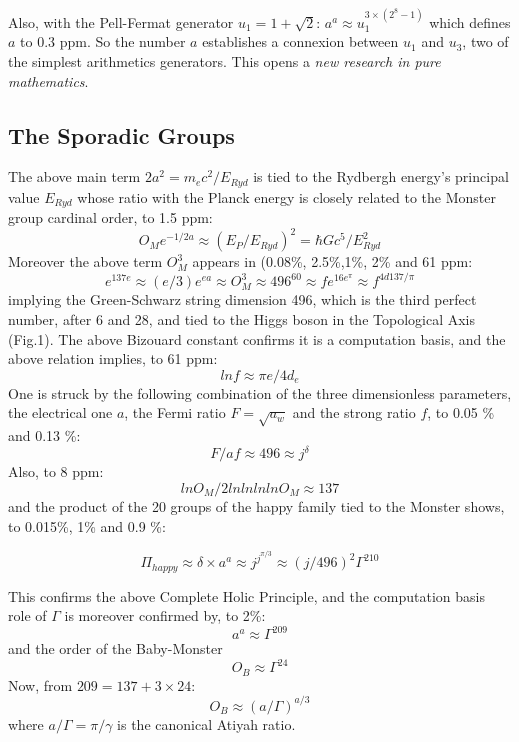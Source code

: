 \documentclass[twoside,draft]{article}
\begin{document}
\begin{sloppypar}
{Also, with the Pell-Fermat generator $u_{1} = 1 + \sqrt{2}$:
$a^{a} \approx u_1^{3\times(2^{8}-1)}$
which defines $a$ to 0.3 ppm. So the number $a$ establishes a connexion between $u_{1}$ and $u_{3}$, two of the
simplest arithmetics generators. This opens a \textit{new research in pure mathematics}.

\subsection{The Sporadic Groups}

The above main term $2a^{2} = m_{e} c^{2}/E_{Ryd}$ is
tied to the Rydbergh energy's principal value $E_{Ryd}$ whose ratio with the Planck energy is closely
related to the Monster group cardinal order, to 1.5 ppm:
\begin{equation}
O_{M} e^{-1/2a} \approx (E_{P} /E_{Ryd})^{2} = \hbar Gc^{5}/E_{Ryd}^{2}
\end{equation}
Moreover the above term $O_M^3$ appears in (0.08\%, 2.5\%,1\%, 2\% and 61 ppm:
$$e^{137e}\approx (e/3)e^{ea}\approx O_M^3 \approx 496^{60} \approx fe^{16e^\pi} \approx f^{4d137/\pi}$$
implying the Green-Schwarz string dimension 496, which is the third perfect number, after 6 and 28, and tied to the Higgs boson in the Topological Axis (Fig.1). The above Bizouard constant confirms it is a computation basis, and the above relation implies, to 61 ppm:
\begin{equation}
lnf\approx \pi e/4d_e
\end{equation}
One is struck by the following combination of the three dimensionless parameters, the electrical
one $a$, the Fermi ratio $F =\sqrt{a_{w}}$ and the strong ratio $f$, to 0.05 \% and 0.13 \%:
\begin{equation}
F/af \approx 496\approx j^{\delta}
\end{equation}
Also, to 8 ppm: $$lnO_{M} /2lnlnlnlnO_{M} \approx 137$$ and the product of the 20 groups of the happy family tied
to the Monster shows, to 0.015\%, 1\% and 0.9 \%:

$$\Pi_{happy} \approx \delta \times a^{a} \approx j^{j^{\pi/3}} \approx (j/496)^2 \Gamma^{210}$$

This confirms the above Complete Holic Principle, and the computation basis role of $\Gamma$ is moreover confirmed by, to 2\%: $$a^a \approx \Gamma^{209}$$ and the order of the Baby-Monster $$O_B\approx\Gamma^{24}$$ Now, from $209 = 137 + 3\times 24$:
\begin{equation}
O_B \approx (a/\Gamma)^{a/3}
\end{equation}
where $a/\Gamma = \pi/\gamma $ is the canonical Atiyah ratio.

}
\end{sloppypar}
\end{document}
